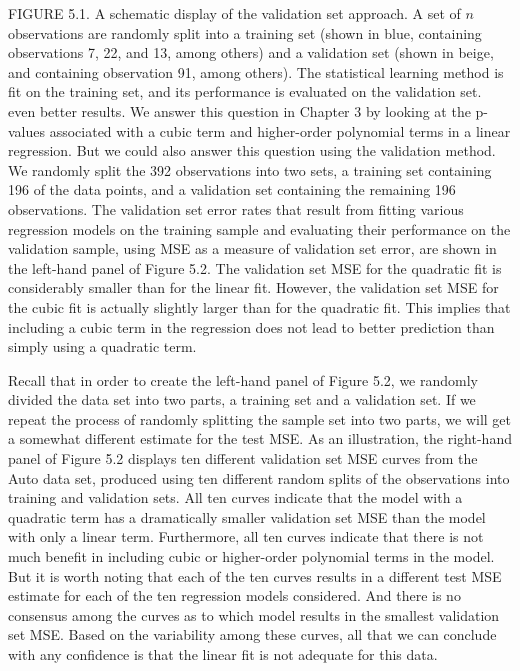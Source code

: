 \documentclass[10pt]{article}
\begin{document}
FIGURE 5.1. A schematic display of the validation set approach. A set of $n$ observations are randomly split into a training set (shown in blue, containing observations 7, 22, and 13, among others) and a validation set (shown in beige, and containing observation 91, among others). The statistical learning method is fit on the training set, and its performance is evaluated on the validation set.\\
even better results. We answer this question in Chapter 3 by looking at the p-values associated with a cubic term and higher-order polynomial terms in a linear regression. But we could also answer this question using the validation method. We randomly split the 392 observations into two sets, a training set containing 196 of the data points, and a validation set containing the remaining 196 observations. The validation set error rates that result from fitting various regression models on the training sample and evaluating their performance on the validation sample, using MSE as a measure of validation set error, are shown in the left-hand panel of Figure 5.2. The validation set MSE for the quadratic fit is considerably smaller than for the linear fit. However, the validation set MSE for the cubic fit is actually slightly larger than for the quadratic fit. This implies that including a cubic term in the regression does not lead to better prediction than simply using a quadratic term.

Recall that in order to create the left-hand panel of Figure 5.2, we randomly divided the data set into two parts, a training set and a validation set. If we repeat the process of randomly splitting the sample set into two parts, we will get a somewhat different estimate for the test MSE. As an illustration, the right-hand panel of Figure 5.2 displays ten different validation set MSE curves from the Auto data set, produced using ten different random splits of the observations into training and validation sets. All ten curves indicate that the model with a quadratic term has a dramatically smaller validation set MSE than the model with only a linear term. Furthermore, all ten curves indicate that there is not much benefit in including cubic or higher-order polynomial terms in the model. But it is worth noting that each of the ten curves results in a different test MSE estimate for each of the ten regression models considered. And there is no consensus among the curves as to which model results in the smallest validation set MSE. Based on the variability among these curves, all that we can conclude with any confidence is that the linear fit is not adequate for this data.
\end{document}
